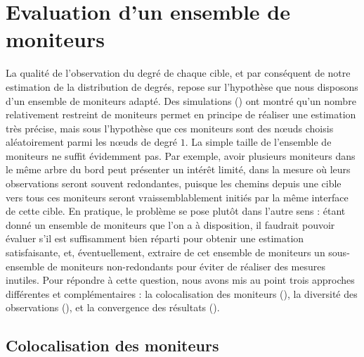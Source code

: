 \section{Evaluation d'un ensemble de moniteurs}
\label{sec:udpping-monitors}

La qualité de l'observation du degré de chaque cible, et par conséquent de notre
estimation de la distribution de degrés, repose sur l'hypothèse que nous
disposons d'un ensemble de moniteurs adapté. Des simulations
() ont montré qu'un nombre relativement restreint de
moniteurs permet en principe de réaliser une estimation très précise,
mais sous l'hypothèse que ces moniteurs sont des n\oe{}uds choisis aléatoirement
parmi les n\oe{}uds de degré $1$. La simple taille de l'ensemble de moniteurs ne
suffit évidemment pas. Par exemple, avoir plusieurs moniteurs dans le même arbre
du bord peut présenter un intérêt limité, dans la mesure où leurs observations
seront souvent redondantes, puisque les chemins depuis une cible vers tous ces
moniteurs seront vraissemblablement initiés par la même interface de cette
cible. En pratique, le problème se pose plutôt dans l'autre sens :
étant donné un ensemble de moniteurs que l'on a à disposition, il faudrait
pouvoir évaluer s'il est suffisamment bien réparti pour obtenir une estimation
satisfaisante, et, éventuellement, extraire de cet ensemble de moniteurs un
sous-ensemble de moniteurs non-redondants pour éviter de réaliser des mesures
inutiles. Pour répondre à cette question, nous avons mis au point trois
approches différentes et complémentaires : la colocalisation des moniteurs
(), la diversité des observations
(), et la convergence des résultats
().

\subsection{Colocalisation des moniteurs}
\label{subsec:udpping-monitors-coloc}

